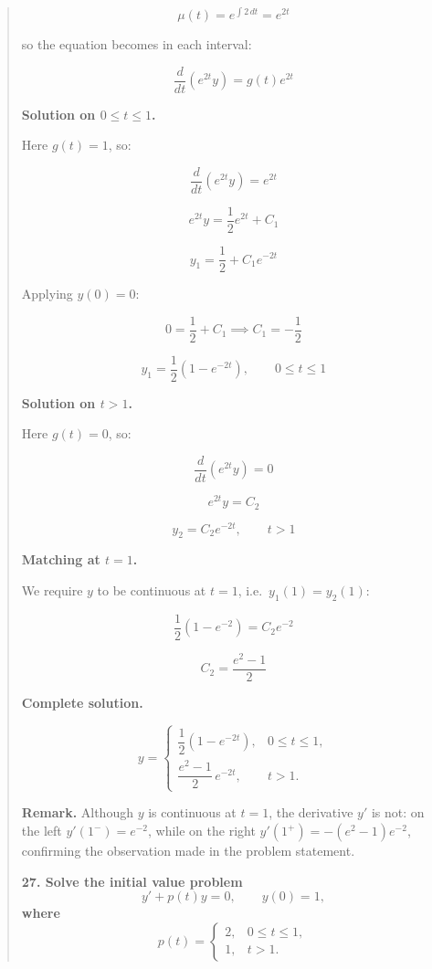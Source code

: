 \begin{quote}
\begin{respuesta}
\[
\mu(t) = e^{\int 2\, dt} = e^{2t}
\]

so the equation becomes in each interval:

\[
\frac{d}{dt}\left(e^{2t}y\right) = g(t)e^{2t}
\]

\textbf{Solution on $0 \le t \le 1$.}

Here $g(t) = 1$, so:

\[
\frac{d}{dt}\left(e^{2t}y\right) = e^{2t}
\]

\[
e^{2t}y = \frac{1}{2}e^{2t} + C_1
\]

\[
y_1 = \frac{1}{2} + C_1 e^{-2t}
\]

Applying $y(0) = 0$:

\[
0 = \frac{1}{2} + C_1 \implies C_1 = -\frac{1}{2}
\]

\[
y_1 = \frac{1}{2}\left(1 - e^{-2t}\right), \qquad 0 \le t \le 1
\]

\textbf{Solution on $t > 1$.}

Here $g(t) = 0$, so:

\[
\frac{d}{dt}\left(e^{2t}y\right) = 0
\]

\[
e^{2t}y = C_2
\]

\[
y_2 = C_2 e^{-2t}, \qquad t > 1
\]

\textbf{Matching at $t = 1$.}

We require $y$ to be continuous at $t = 1$, i.e.\ $y_1(1) = y_2(1)$:

\[
\frac{1}{2}\left(1 - e^{-2}\right) = C_2 e^{-2}
\]

\[
C_2 = \frac{e^{2} - 1}{2}
\]

\textbf{Complete solution.}

\[
\boxed{y = \begin{cases} \dfrac{1}{2}\!\left(1 - e^{-2t}\right), & 0 \le t \le 1, \\[8pt] \dfrac{e^{2}-1}{2}\,e^{-2t}, & t > 1. \end{cases}}
\]

\textbf{Remark.} Although $y$ is continuous at $t = 1$, the derivative $y'$ is not: on
the left $y'(1^-) = e^{-2}$, while on the right $y'(1^+) = -(e^2-1)e^{-2}$, confirming
the observation made in the problem statement.

\end{respuesta}


\textbf{27. Solve the initial value problem
    \[ y' + p(t)y = 0, \qquad y(0) = 1, \]
    where
    \[ p(t) = \begin{cases} 2, & 0 \le t \le 1, \\ 1, & t > 1. \end{cases} \]}
\begin{respuesta}


\end{respuesta}
\end{quote}
